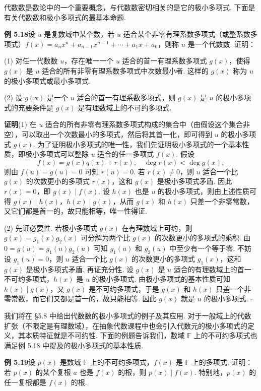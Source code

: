 \documentclass[UTF8,12pt,a4paper,fontset=fandol]{ctexart}
\begin{document}
代数数是数论中的一个重要概念，与代数数密切相关的是它的极小多项式. 下面是有关代数数和极小多项式的最基本命题.

\noindent\textbf{例 5.18}\quad 设 $u$ 是复数域中某个数，若 $u$ 适合某个非零有理系数多项式（或整系数多项式）$f(x)=a_nx^n+a_{n-1}x^{n-1}+\cdots+a_1x+a_0$，则称 $u$ 是一个代数数. 证明：

(1) 对任一代数数 $u$，存在唯一一个 $u$ 适合的首一有理系数多项式 $g(x)$，使得 $g(x)$ 是 $u$ 适合的所有非零有理系数多项式中次数最小者. 这样的 $g(x)$ 称为 $u$ 的极小多项式或最小多项式.

(2) 设 $g(x)$ 是一个 $u$ 适合的首一有理系数多项式，则 $g(x)$ 是 $u$ 的极小多项式的充要条件是 $g(x)$ 是有理数域上的不可约多项式.

\noindent\textbf{证明}\quad (1) 在 $u$ 适合的所有非零有理系数多项式构成的集合中（由假设这个集合非空），可以取出一个次数最小的多项式，然后将其首一化，即可得到 $u$ 的极小多项式 $g(x)$. 为了证明极小多项式的唯一性，我们先证明极小多项式的一个基本性质，即极小多项式可以整除 $u$ 适合的任一多项式 $f(x)$. 假设
\[
f(x)=g(x)q(x)+r(x),\quad \deg r(x)<\deg g(x),
\]
则由 $f(u)=g(u)=0$ 可知 $r(u)=0$. 若 $r(x)\ne0$，则 $u$ 适合一个比 $g(x)$ 的次数更小的多项式 $r(x)$，这和 $g(x)$ 是极小多项式矛盾. 因此 $r(x)=0$，即 $g(x)\mid f(x)$. 设 $h(x)$ 也是 $u$ 的极小多项式，则由上述性质可得 $g(x)\mid h(x)$，$h(x)\mid g(x)$，从而 $g(x)$ 和 $h(x)$ 只差一个非零常数，又它们都是首一的，故只能相等，唯一性得证.

(2) 先证必要性. 若极小多项式 $g(x)$ 在有理数域上可约，则 $g(x)=g_1(x)g_2(x)$ 可分解为两个比 $g(x)$ 的次数更小的多项式的乘积. 由 $0=g(u)=g_1(u)g_2(u)$ 可知 $g_1(u)$ 和 $g_2(u)$ 中至少有一个等于零. 不妨设 $g_1(u)=0$，则 $u$ 适合一个比 $g(x)$ 的次数更小的多项式 $g_1(x)$，这和 $g(x)$ 是极小多项式矛盾. 再证充分性. 设 $g(x)$ 是 $u$ 适合的有理数域上的首一不可约多项式，$h(x)$ 是 $u$ 的极小多项式. 由极小多项式的基本性质可知 $h(x)\mid g(x)$，又 $g(x)$ 是不可约多项式，于是 $g(x)$ 和 $h(x)$ 只差一个非零常数，而它们又都是首一的，故只能相等. 因此 $g(x)$ 就是 $u$ 的极小多项式. \hfill $\square$

我们将在 §5.8 中给出代数数的极小多项式的例子及其应用. 对于一般域上的代数扩张（不限定是有理数域），在抽象代数课程中也会引入代数元的极小多项式的定义，其本质特征就是不可约性. 下面的例题告诉我们，数域 $\mathbb{F}$ 上的不可约多项式也满足例 5.18 中提及的极小多项式的基本性质.

\noindent\textbf{例 5.19}\quad 设 $p(x)$ 是数域 $\mathbb{F}$ 上的不可约多项式，$f(x)$ 是 $\mathbb{F}$ 上的多项式. 证明：若 $p(x)$ 的某个复根 $a$ 也是 $f(x)$ 的根，则 $p(x)\mid f(x)$. 特别地，$p(x)$ 的任一复根都是 $f(x)$ 的根.
\end{document}
